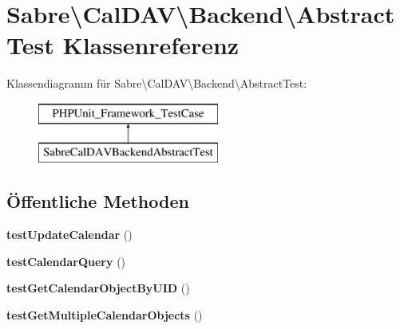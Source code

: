 \hypertarget{class_sabre_1_1_cal_d_a_v_1_1_backend_1_1_abstract_test}{}\section{Sabre\textbackslash{}Cal\+D\+AV\textbackslash{}Backend\textbackslash{}Abstract\+Test Klassenreferenz}
\label{class_sabre_1_1_cal_d_a_v_1_1_backend_1_1_abstract_test}
Klassendiagramm für Sabre\textbackslash{}Cal\+D\+AV\textbackslash{}Backend\textbackslash{}Abstract\+Test\+:\begin{figure}[H]
\begin{center}
\leavevmode
\includegraphics[height=2.000000cm]{class_sabre_1_1_cal_d_a_v_1_1_backend_1_1_abstract_test}
\end{center}
\end{figure}
\subsection*{Öffentliche Methoden}
\begin{DoxyCompactItemize}
\item 
\mbox{\label{class_sabre_1_1_cal_d_a_v_1_1_backend_1_1_abstract_test_a8eb8ff5d84d00e80681693caaf2b27ed}} 
{\bfseries test\+Update\+Calendar} ()
\item 
\mbox{\label{class_sabre_1_1_cal_d_a_v_1_1_backend_1_1_abstract_test_abe377170df6b9b6465190b46bf7e12df}} 
{\bfseries test\+Calendar\+Query} ()
\item 
\mbox{\label{class_sabre_1_1_cal_d_a_v_1_1_backend_1_1_abstract_test_ab01171647a3dc02bf11492ba4c72a9e9}} 
{\bfseries test\+Get\+Calendar\+Object\+By\+U\+ID} ()
\item 
\mbox{\label{class_sabre_1_1_cal_d_a_v_1_1_backend_1_1_abstract_test_abef861cf13ba5d5b5fc5dbbc4b71c997}} 
{\bfseries test\+Get\+Multiple\+Calendar\+Objects} ()
\end{DoxyCompactItemize}


